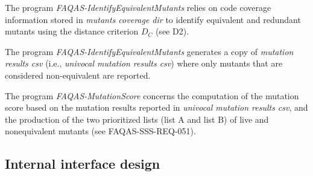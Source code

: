 The program \emph{FAQAS-IdentifyEquivalentMutants} relies on code coverage information stored in \emph{mutants coverage dir} to identify equivalent and redundant mutants using the distance criterion $D_C$ (see D2).

The program \emph{FAQAS-IdentifyEquivalentMutants} generates a copy of \emph{mutation results csv} (i.e., \emph{univocal mutation results csv}) where only mutants that are considered non-equivalent are reported.

The program \emph{FAQAS-MutationScore} concerns the computation of the mutation score based on the mutation results reported in \emph{univocal mutation results csv}, and the production of the two prioritized lists (list A and list B) of live and nonequivalent mutants (see FAQAS-SSS-REQ-051).


\subsection{Internal interface design}



